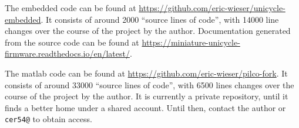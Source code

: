 \documentclass[main.tex]{subfiles}
\begin{document}
The embedded code can be found at \url{https://github.com/eric-wieser/unicycle-embedded}.
It consists of around 2000 \enquote{source lines of code}, with 14000 line changes over the course of the project by the author.
Documentation generated from the source code can be found at \url{https://miniature-unicycle-firmware.readthedocs.io/en/latest/}.

The matlab code can be found at \url{https://github.com/eric-wieser/pilco-fork}.
It consists of around 33000 \enquote{source lines of code}, with 6500 lines changes over the course of the project by the author.
It is currently a private repository, until it finds a better home under a shared account.
Until then, contact the author or \texttt{cer54@} to obtain access.
\end{document}
